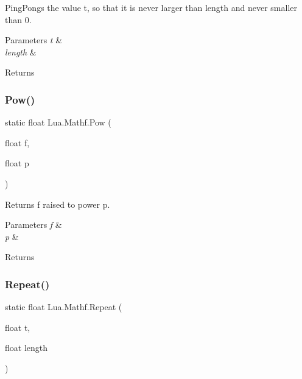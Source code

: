 Ping\+Pongs the value t, so that it is never larger than length and never smaller than 0. 


\begin{DoxyParams}{Parameters}
{\em t} & \\
\hline
{\em length} & \\
\hline
\end{DoxyParams}
\begin{DoxyReturn}{Returns}

\end{DoxyReturn}
\mbox{\label{class_lua_1_1_mathf_ace6b91fa037354fa541a5de450ba6e23}} 
\subsubsection{\texorpdfstring{Pow()}{Pow()}}
{\footnotesize\ttfamily static float Lua.\+Mathf.\+Pow (\begin{DoxyParamCaption}\item[{float}]{f,  }\item[{float}]{p }\end{DoxyParamCaption})\hspace{0.3cm}{\ttfamily [static]}}



Returns f raised to power p. 


\begin{DoxyParams}{Parameters}
{\em f} & \\
\hline
{\em p} & \\
\hline
\end{DoxyParams}
\begin{DoxyReturn}{Returns}

\end{DoxyReturn}
\mbox{\label{class_lua_1_1_mathf_abf1f882dcf08b3749a27a28f6f7f3630}} 
\subsubsection{\texorpdfstring{Repeat()}{Repeat()}}
{\footnotesize\ttfamily static float Lua.\+Mathf.\+Repeat (\begin{DoxyParamCaption}\item[{float}]{t,  }\item[{float}]{length }\end{DoxyParamCaption})\hspace{0.3cm}{\ttfamily [static]}}



